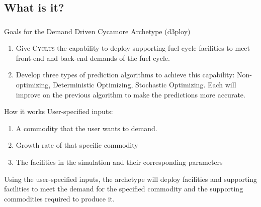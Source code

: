 \newcommand{\Cyclus}{\textsc{Cyclus}\xspace}%
\subsection{What is it?}
\begin{frame}
  \frametitle{}

\begin{block}{Goals for the Demand Driven Cycamore Archetype (d3ploy)}
\begin{enumerate}
	\item Give \Cyclus the capability to deploy supporting fuel cycle facilities to meet front-end and back-end demands of the fuel cycle. 
	\item Develop three types of prediction algorithms to achieve this capability: Non-optimizing, Deterministic Optimizing, Stochastic Optimizing. Each will improve on the previous algorithm to make the predictions more accurate. 
\end{enumerate}
\end{block}

\begin{block}{How it works}
User-specified inputs: 
\begin{enumerate}
	\item A commodity that the user wants to demand. 
	\item Growth rate of that specific commodity 
	\item The facilities in the simulation and their corresponding parameters
\end{enumerate}
Using the user-specified inputs, the archetype will deploy facilities and supporting facilities to meet the demand for the specified commodity and the supporting commodities required to produce it. 
\end{block}

\end{frame}

